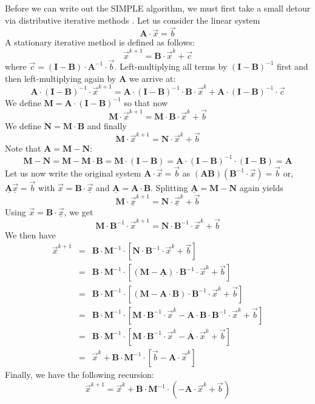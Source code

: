 Before we can write out the SIMPLE algorithm, we must first take a small detour via 
distributive iterative methods \cite{vusb00,tack10}.
Let us consider the linear system 
\[
{\bm A}\cdot \vec{x}=\vec{b}
\] 
A stationary iterative method is defined as follows:
\[
\vec{x}^{k+1}= {\bm B}\cdot \vec{x}^{k}+ \vec{c}
\]
where $\vec{c}=({\bm I}-{\bm B})\cdot {\bm A}^{-1}\cdot \vec{b}$. 
Left-multiplying all terms by $({\bm I}-{\bm B})^{-1}$ first and then left-multiplying again 
by ${\bm A}$  we arrive at:
\[
{\bm A}\cdot ({\bm I}-{\bm B})^{-1}\cdot \vec{x}^{k+1}
={\bm A}\cdot ({\bm I}-{\bm B})^{-1}\cdot {\bm B}\cdot 
\vec{x}^{k} + {\bm A}\cdot ({\bm I}-{\bm B})^{-1} \cdot \vec{c}
\]
We define ${\bm M}={\bm A}\cdot ({\bm I}-{\bm B})^{-1} $ so that now
\[
{\bm M}\cdot\vec{x}^{k+1}={\bm M}\cdot {\bm B}\cdot \vec{x}^{k}+\vec{b} 
\]
We define ${\bm N}={\bm M}\cdot {\bm B}$
and finally 
\[
{\bm M}\cdot\vec{x}^{k+1}={\bm N}\cdot \vec{x}^{k}+\vec{b} 
\]
Note that ${\bm A}={\bm M}-{\bm N}$:
\[
{\bm M}-{\bm N}={\bm M}-{\bm M}\cdot {\bm B}
= {\bm M}\cdot  ({\bm I}-{\bm B}) 
= {\bm A}\cdot ({\bm I}-{\bm B})^{-1}\cdot ({\bm I}-{\bm B}) 
= {\bm A}
\]
Let us now write the original system 
${\bm A}\cdot \vec{x}=\vec{b}$ as $({\bm A}{\bm B})({\bm B}^{-1}\cdot \vec{x})=\vec{b}$
or, $ \underline{\bm A} \underline{\vec{x}}=\vec{b} $
with 
$\vec{x}={\bm B}\cdot \underline{\vec{x}}$
and 
$\underline{\bm A}={\bm A}\cdot {\bm B}$.
Splitting $\underline{\bm A}={\bm M}-{\bm N}$ again yields 
\[
{\bm M}\cdot \underline{\vec{x}}^{k+1}={\bm N}\cdot \underline{\vec{x}}^{k}+\vec{b} 
\]
Using $\vec{x}={\bm B}\cdot \underline{\vec{x}}$, we get 
\[
{\bm M}\cdot {\bm B}^{-1}\cdot \vec{x}^{k+1} = {\bm N}\cdot {\bm B}^{-1}\cdot  \vec{x}^{k}+\vec{b} 
\]
We then have 
\begin{eqnarray}
\vec{x}^{k+1}
&=&  {\bm B}\cdot {\bm M}^{-1} \cdot[ {\bm N} \cdot  {\bm B}^{-1}  \cdot \vec{x}^{k}+ \vec{b}  ] \\
&=&  {\bm B}\cdot {\bm M}^{-1} \cdot[ ({\bm M} - \underline{\bm A}) \cdot  {\bm B}^{-1}\cdot \vec{x}^{k}+\vec{b}  ]\\
&=&  {\bm B}\cdot {\bm M}^{-1} \cdot[ ({\bm M} - {\bm A}\cdot {\bm B}) \cdot  {\bm B}^{-1}\cdot  \vec{x}^{k}+ \vec{b}  ]\\
&=&  {\bm B}\cdot {\bm M}^{-1} \cdot[ {\bm M}\cdot {\bm B}^{-1} \cdot \vec{x}^{k} - {\bm A}\cdot {\bm B}\cdot  {\bm B}^{-1} \cdot \vec{x}^{k}+\vec{b}  ]\\
&=&  {\bm B}\cdot {\bm M}^{-1} \cdot[ {\bm M}\cdot {\bm B}^{-1} \cdot \vec{x}^{k} - {\bm A}\cdot \vec{x}^{k}+ \vec{b}  ]\\
&=&  \vec{x}^k + {\bm B}\cdot {\bm M}^{-1}\cdot [ \vec{b}    - {\bm A} \cdot \vec{x}^{k}  ]
\end{eqnarray}
Finally, we have the following recursion:
\begin{equation}
\boxed{\vec{x}^{k+1} = \vec{x}^k +{\bm B} \cdot {\bm M} ^{-1}\cdot (-{\bm A}\cdot \vec{x}^{k} + \vec{b}  ) }
\end{equation}


